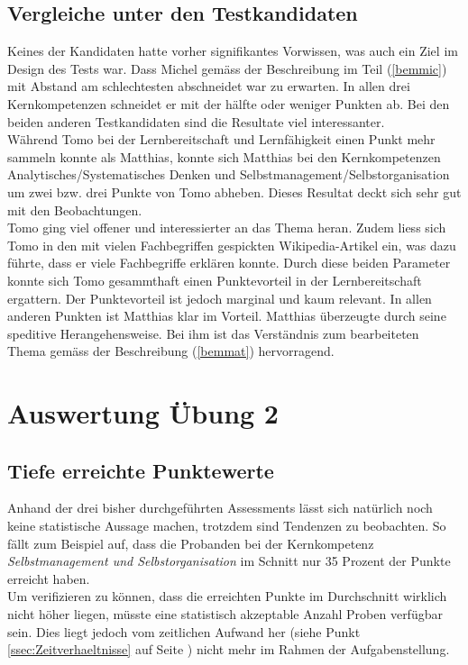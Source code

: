 \subsection{Vergleiche unter den Testkandidaten}
Keines der Kandidaten hatte vorher signifikantes Vorwissen, was auch ein Ziel im Design des Tests war.
Dass Michel gemäss der Beschreibung im Teil (\ref{bemmic}) mit Abstand am schlechtesten abschneidet war zu erwarten. In allen drei Kernkompetenzen schneidet er mit der hälfte oder weniger Punkten ab. Bei den beiden anderen Testkandidaten sind die Resultate viel interessanter. \\
Während Tomo bei der Lernbereitschaft und Lernfähigkeit einen Punkt mehr sammeln konnte als Matthias, konnte sich Matthias bei den Kernkompetenzen Analytisches/Systematisches Denken und Selbstmanagement/Selbstorganisation um zwei bzw. drei Punkte von Tomo abheben. Dieses Resultat deckt sich sehr gut mit den Beobachtungen. \\
Tomo ging viel offener und interessierter an das Thema heran. Zudem liess sich Tomo in den mit vielen Fachbegriffen gespickten Wikipedia-Artikel ein, was dazu führte, dass er viele Fachbegriffe erklären konnte. Durch diese beiden Parameter konnte sich Tomo gesammthaft einen Punktevorteil in der Lernbereitschaft ergattern. Der Punktevorteil ist jedoch marginal und kaum relevant. In allen anderen Punkten ist Matthias klar im Vorteil. Matthias überzeugte durch seine speditive Herangehensweise. Bei ihm ist das Verständnis zum bearbeiteten Thema gemäss der Beschreibung (\ref{bemmat}) hervorragend. 

\section{Auswertung Übung 2}

\subsection{Tiefe erreichte Punktewerte}

Anhand der drei bisher durchgeführten Assessments lässt sich natürlich noch keine statistische Aussage machen, trotzdem sind Tendenzen zu beobachten. So fällt zum Beispiel auf, dass die Probanden bei der Kernkompetenz \textit{Selbstmanagement und Selbstorganisation} im Schnitt nur 35 Prozent der Punkte erreicht haben.\\
Um verifizieren zu können, dass die erreichten Punkte im Durchschnitt wirklich nicht höher liegen, müsste eine statistisch akzeptable Anzahl Proben verfügbar sein. Dies liegt jedoch vom zeitlichen Aufwand her (siehe Punkt \ref{ssec:Zeitverhaeltnisse} auf Seite \pageref{ssec:Zeitverhaeltnisse}) nicht mehr im Rahmen der Aufgabenstellung.
